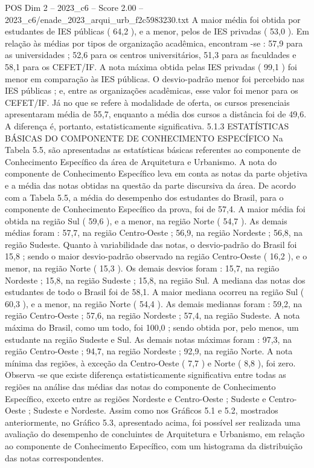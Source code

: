 \begin{textsample}{POS Dim 2 – 2023\_c6 – Score 2.00 – 2023\_c6/enade\_2023\_arqui\_urb\_f2c5983230.txt}
A maior média foi obtida por estudantes de IES públicas ( 64,2 ), e a menor, pelos de IES privadas ( 53,0 ).
Em relação às médias por tipos de organização acadêmica, encontram -se : 57,9 para as universidades ; 52,6 para os centros universitários, 51,3 para as faculdades e 58,1 para os CEFET/IF.
A nota máxima obtida pelas IES privadas ( 99,1 ) foi menor em comparação às IES públicas.
O desvio-padrão menor foi percebido nas IES públicas ; e, entre as organizações acadêmicas, esse valor foi menor para os CEFET/IF.
Já no que se refere à modalidade de oferta, os cursos presenciais apresentaram média de 55,7, enquanto a média dos cursos a distância foi de 49,6.
A diferença é, portanto, estatisticamente significativa. 5.1.3 ESTATÍSTICAS BÁSICAS DO COMPONENTE DE CONHECIMENTO ESPECÍFICO Na Tabela 5.5, são apresentadas as estatísticas básicas referentes ao componente de Conhecimento Específico da área de Arquitetura e Urbanismo.
A nota do componente de Conhecimento Específico leva em conta as notas da parte objetiva e a média das notas obtidas na questão da parte discursiva da área.
De acordo com a Tabela 5.5, a média do desempenho dos estudantes do Brasil, para o componente de Conhecimento Específico da prova, foi de 57,4.
A maior média foi obtida na região Sul ( 59,6 ), e a menor, na região Norte ( 54,7 ).
As demais médias foram : 57,7, na região Centro-Oeste ; 56,9, na região Nordeste ; 56,8, na região Sudeste.
Quanto à variabilidade das notas, o desvio-padrão do Brasil foi 15,8 ; sendo o maior desvio-padrão observado na região Centro-Oeste ( 16,2 ), e o menor, na região Norte ( 15,3 ).
Os demais desvios foram : 15,7, na região Nordeste ; 15,8, na região Sudeste ; 15,8, na região Sul.
A mediana das notas dos estudantes de todo o Brasil foi de 58,1.
A maior mediana ocorreu na região Sul ( 60,3 ), e a menor, na região Norte ( 54,4 ).
As demais medianas foram : 59,2, na região Centro-Oeste ; 57,6, na região Nordeste ; 57,4, na região Sudeste.
A nota máxima do Brasil, como um todo, foi 100,0 ; sendo obtida por, pelo menos, um estudante na região Sudeste e Sul.
As demais notas máximas foram : 97,3, na região Centro-Oeste ; 94,7, na região Nordeste ; 92,9, na região Norte.
A nota mínima das regiões, à exceção da Centro-Oeste ( 7,7 ) e Norte ( 8,8 ), foi zero.
Observa -se que existe diferença estatisticamente significativa entre todas as regiões na análise das médias das notas do componente de Conhecimento Específico, exceto entre as regiões Nordeste e Centro-Oeste ; Sudeste e Centro-Oeste ; Sudeste e Nordeste.
Assim como nos Gráficos 5.1 e 5.2, mostrados anteriormente, no Gráfico 5.3, apresentado acima, foi possível ser realizada uma avaliação do desempenho de concluintes de Arquitetura e Urbanismo, em relação ao componente de Conhecimento Específico, com um histograma da distribuição das notas correspondentes.

\end{textsample}
